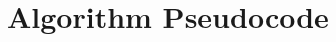 \documentclass{article}
\theoremstyle{plain}
\theoremstyle{definition}
\theoremstyle{remark}
\begin{document}



\section{Algorithm Pseudocode}
\label{app:algorithm}
\end{document}

